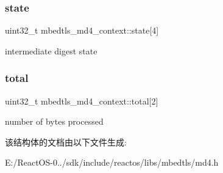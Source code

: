 \subsubsection{\texorpdfstring{state}{state}}
{\footnotesize\ttfamily uint32\+\_\+t mbedtls\+\_\+md4\+\_\+context\+::state\mbox{[}4\mbox{]}}

intermediate digest state \mbox{\label{structmbedtls__md4__context_afabfb5a783d0033a857a375199bf38cc}} 
\subsubsection{\texorpdfstring{total}{total}}
{\footnotesize\ttfamily uint32\+\_\+t mbedtls\+\_\+md4\+\_\+context\+::total\mbox{[}2\mbox{]}}

number of bytes processed 

该结构体的文档由以下文件生成\+:\begin{DoxyCompactItemize}
\item 
E\+:/\+React\+O\+S-\/0../sdk/include/reactos/libs/mbedtls/md4.\+h\end{DoxyCompactItemize}
